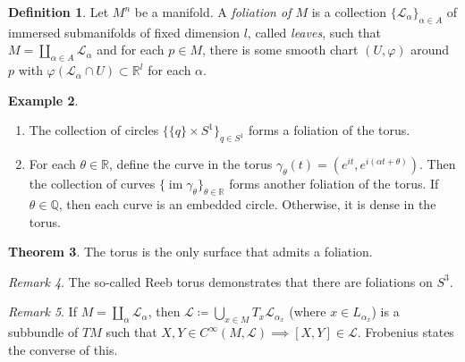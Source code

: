 \documentclass[10pt,letterpaper,cm]{nupset}
\theoremstyle{definition}
\newtheorem{definition}{Definition}[subsection]
\newtheorem{exmp}[definition]{Example}
\theoremstyle{theorem}
\newtheorem{theorem}[definition]{Theorem}
\theoremstyle{remark}
\newtheorem{remark}[definition]{Remark}
\renewcommand{\L}{\mathscr L}
\newcommand{\Q}{\mathbb Q}
\newcommand{\R}{\mathbb{R}}
\newcommand{\1}{\mathbb{1}}
\newcommand{\0}{\vec 0}
\DeclareMathOperator{\im}{im}
\begin{document}
\begin{definition}
Let $M^n$ be a manifold. A \textit{foliation of $M$} is a collection $\{\L_{\alpha}\}_{\alpha \in A}$ of immersed submanifolds of fixed dimension $l$, called \textit{leaves}, such that $M = \coprod_{\alpha \in A}\L_{\alpha}$ and for each $p\in M$, there is some smooth chart $(U, \varphi)$ around $p$ with $\varphi(\L_{\alpha} \cap U) \subset \R^l$ for each $\alpha$.
\end{definition}

\begin{exmp} $ $
\begin{enumerate}
\item The collection of circles $\{ \{q\} \times S^1\}_{q\in S^1}$ forms a foliation of the torus. 
\item For each $\theta \in \R$, define the curve in the torus $\gamma_{\theta}(t) = (e^{it}, e^{i(\alpha t + \theta)})$. Then the collection of curves $\{\im{\gamma_{\theta}}\}_{\theta \in \R}$ forms another foliation of the torus. If $\theta \in \Q$, then each curve is an embedded circle. Otherwise, it is dense in the torus. 
\end{enumerate}
\end{exmp}

\begin{theorem}
The torus is the only surface that admits a foliation. 
\end{theorem}

\begin{remark}
The so-called Reeb torus demonstrates that there are foliations on $S^3$. 
\end{remark}

\begin{remark}
If $M = \coprod_{\alpha} \L_{\alpha}$, then $\L \coloneqq  \bigcup_{x\in M} T_x \L_{\alpha_x}$ (where $x\in L_{\alpha_x}$) is a subbundle of $TM$ such that $X, Y \in C^{\infty}(M, \L) \implies [X, Y] \in \L$. Frobenius states the converse of this. 
\end{remark}
\end{document}
